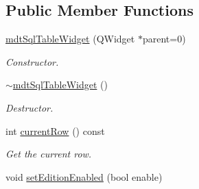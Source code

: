 \subsection*{Public Member Functions}
\begin{DoxyCompactItemize}
\item 
\hypertarget{classmdt_sql_table_widget_a4cf2b0d69608e88d33996148f612e58d}{
\hyperlink{classmdt_sql_table_widget_a4cf2b0d69608e88d33996148f612e58d}{mdtSqlTableWidget} (QWidget $\ast$parent=0)}
\label{classmdt_sql_table_widget_a4cf2b0d69608e88d33996148f612e58d}

\begin{DoxyCompactList}\small\item\em Constructor. \end{DoxyCompactList}\item 
\hypertarget{classmdt_sql_table_widget_ab5db8a20c64340bba4841a1b1c928d7f}{
\hyperlink{classmdt_sql_table_widget_ab5db8a20c64340bba4841a1b1c928d7f}{$\sim$mdtSqlTableWidget} ()}
\label{classmdt_sql_table_widget_ab5db8a20c64340bba4841a1b1c928d7f}

\begin{DoxyCompactList}\small\item\em Destructor. \end{DoxyCompactList}\item 
\hypertarget{classmdt_sql_table_widget_a7612cf9cb10c69365b7ed820d71e6cb2}{
int \hyperlink{classmdt_sql_table_widget_a7612cf9cb10c69365b7ed820d71e6cb2}{currentRow} () const }
\label{classmdt_sql_table_widget_a7612cf9cb10c69365b7ed820d71e6cb2}

\begin{DoxyCompactList}\small\item\em Get the current row. \end{DoxyCompactList}\item 
\hypertarget{classmdt_sql_table_widget_af5ef66b8ebb45a698f99ad455208f3c8}{
void \hyperlink{classmdt_sql_table_widget_af5ef66b8ebb45a698f99ad455208f3c8}{setEditionEnabled} (bool enable)}
\label{classmdt_sql_table_widget_af5ef66b8ebb45a698f99ad455208f3c8}


\end{DoxyCompactItemize}
